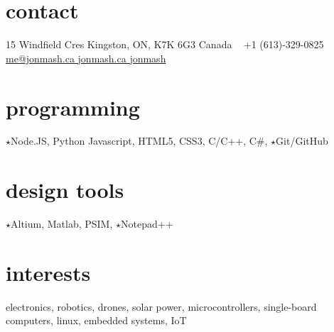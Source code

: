 
\begin{aside}
%
\section{contact}
15 Windfield Cres
Kingston, ON, K7K 6G3
Canada
~
+1 (613)-329-0825
~
\href{mailto:me@jonmash.ca}{me@jonmash.ca \faEnvelope}
\href{http://www.jonmash.ca}{jonmash.ca \faLink}
\href{https://github.com/jonmash}{jonmash \faGithub}
%
\section{programming}
{\color{orange} $\star$}Node.JS, Python
Javascript, HTML5, CSS3, C/C++, C\#,
{\color{orange} $\star$}Git/GitHub
%
\section{design tools}
{\color{orange} $\star$}Altium, Matlab, PSIM, {\color{orange} $\star$}Notepad++
%
\section{interests}
electronics, robotics, drones, solar power, microcontrollers, single-board computers, linux, embedded systems, IoT
%
\end{aside}